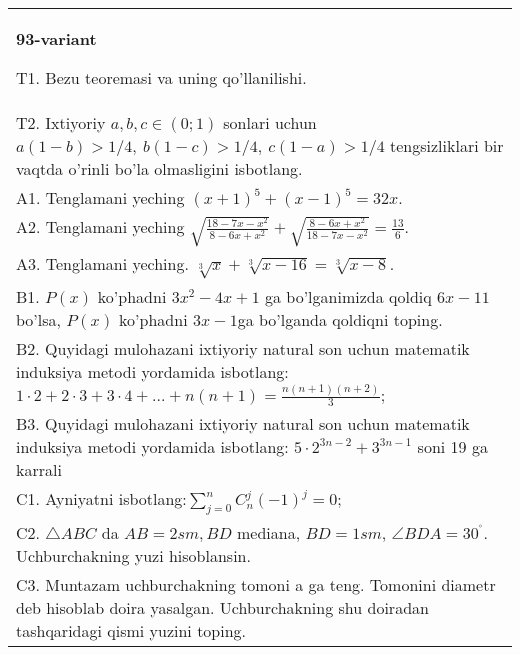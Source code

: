 \documentclass{article}
\begin{document}
\begin{tabular}{m{17cm}}
\textbf{93-variant}
\newline

T1. Bezu teoremasi va uning qo'llanilishi. \\
T2. Ixtiyoriy \(a,b,c \in (0;1)\) sonlari uchun \(a(1 - b) > 1/4,\ b(1 - c) > 1/4,\ c(1 - a) > 1/4\) tengsizliklari bir vaqtda o'rinli bo'la olmasligini isbotlang. \\
A1. Tenglamani yeching \((x + 1)^{5} + (x - 1)^{5} = 32x\). \\
A2. Tenglamani yeching \(\sqrt{\frac{18 - 7x - x^{2}}{8 - 6x + x^{2}}} + \sqrt{\frac{8 - 6x + x^{2}}{18 - 7x - x^{2}}} = \frac{13}{6}\). \\
A3. Tenglamani yeching. \(\sqrt[3]{x} + \sqrt[3]{x - 16} = \sqrt[3]{x - 8}\). \\
B1. \(P(x)\) ko'phadni \(3x^{2} - 4x + 1\) ga bo'lganimizda qoldiq \(6x - 11\) bo'lsa, \(P(x)\) ko'phadni \(3x - 1\)ga bo'lganda qoldiqni toping. \\
B2. Quyidagi mulohazani ixtiyoriy natural son uchun matematik induksiya metodi yordamida isbotlang: \(1 \cdot 2 + 2 \cdot 3 + 3 \cdot 4 + ... + n(n + 1) = \frac{n(n + 1)(n + 2)}{3}\); \\
B3. Quyidagi mulohazani ixtiyoriy natural son uchun matematik induksiya metodi yordamida isbotlang: \(5 \cdot 2^{3n - 2} + 3^{3n - 1}\) soni 19 ga karrali \\
C1. Ayniyatni isbotlang:\(\sum_{j = 0}^{n}C_{n}^{j}( - 1)^{j} = 0\); \\
C2. \(\bigtriangleup ABC\) da \(AB = 2sm,BD\) mediana, \(BD = 1sm\), \(\angle BDA = 30^{{^\circ}}\). Uchburchakning yuzi hisoblansin. \\
C3. Muntazam uchburchakning tomoni a ga teng. Tomonini diametr deb hisoblab doira yasalgan. Uchburchakning shu doiradan tashqaridagi qismi yuzini toping. \\

\end{tabular}
\vspace{1cm}
\end{document}
